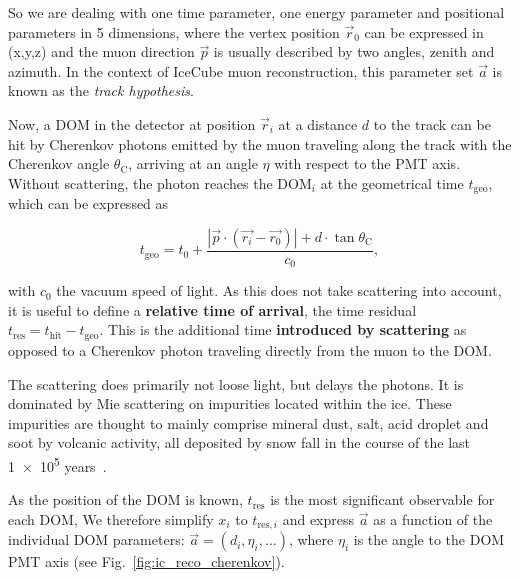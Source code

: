 So we are dealing with one time parameter, one energy parameter and positional parameters in 5 dimensions, where the vertex position $\vec{r}_0$ can be expressed in (x,y,z) and the muon direction $\vec{p}$ is usually described by two angles, zenith and azimuth. In the context of IceCube muon reconstruction, this parameter set $\vec{a}$ is known as the \textit{track hypothesis}.

Now, a DOM in the detector at position $\vec{r}_i$ at a distance $d$ to the track can be hit by Cherenkov photons emitted by the muon traveling along the track with the Cherenkov angle $\theta_\text{C}$, arriving at an angle $\eta$ with respect to the PMT axis. Without scattering, the photon reaches the $\text{DOM}_i$ at the geometrical time $t_\text{geo}$, which can be expressed as

\begin{equation}
    t_\text{geo} = t_0 + \frac{|\vec{p}\cdot(\vec{r_i}-\vec{r_0})|+d\cdot \tan{\theta_\text{C}}}{c_0},
\end{equation}

with $c_0$ the vacuum speed of light. As this does not take scattering into account, it is useful to define a \textbf{relative time of arrival}, the time residual $t_\text{res} = t_\text{hit} - t_\text{geo}$. This is the additional time \textbf{introduced by scattering} as opposed to a Cherenkov photon traveling directly from the muon to the DOM\@.

The scattering does primarily not loose light, but delays the photons. It is dominated by Mie scattering on impurities located within the ice. These impurities are thought to mainly comprise mineral dust, salt, acid droplet and soot by volcanic activity, all deposited by snow fall in the course of the last \num{1e5} years~.

As the position of the DOM is known, $t_\text{res}$ is the most significant observable for each DOM,  We therefore simplify $x_i$ to $t_{\text{res},i}$ and express $\vec{a}$ as a function of the individual DOM parameters: $\vec{a}= (d_i,\eta_i,\ldots)$, where $\eta_i$ is the angle to the DOM PMT axis (see Fig.~\ref{fig:ic_reco_cherenkov}).


